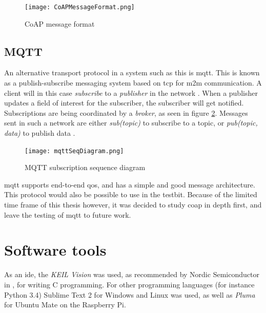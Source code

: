 
\begin{figure}[ht]
    \centering
    \texttt{[image: CoAPMessageFormat.png]}    
    \caption{CoAP message format}
    \label{fig:CoAPMessageFormat}
\end{figure}






\subsection{MQTT}

\noindent An alternative transport protocol in a system such as this is \gls{mqtt}. This is  known as a publish-subscribe messaging system based on \gls{tcp} for \gls{m2m} communication. A client will in this case \textit{subscribe} to a \textit{publisher} in the network \cite{hunkeler2008mqtt}. When a publisher updates a field of interest for the subscriber, the subscriber will get notified. Subscriptions are being coordinated by a \textit{broker}, as seen in figure \ref{fig:mqttSeqDiagram}. Messages sent in such a network are either \textit{sub(topic)} to subscribe to a topic, or \textit{pub(topic, data)} to publish data \cite{mqttWebsite}. 


\begin{figure}[ht]
    \centering
    \texttt{[image: mqttSeqDiagram.png]}    
    \caption{MQTT subscription sequence diagram}
    \label{fig:mqttSeqDiagram}
\end{figure}

\noindent \gls{mqtt} supports end-to-end \gls{qos}, and has a simple and good message architecture. This protocol would also be possible to use in the testbit. Because of the limited time frame of this thesis however, it was decided to study \gls{coap} in depth first, and leave the testing of \gls{mqtt} to future work. 



\section{Software tools}

\noindent As an \gls{ide}, the \textit{KEIL Vision} was used, as recommended by Nordic Semiconductor in \cite{nordicSoftwareTools}, for writing C programming. For other programming languages (for instance Python 3.4) Sublime Text 2 for Windows and Linux was used, as well as \textit{Pluma} for Ubuntu Mate on the Raspberry Pi. 

